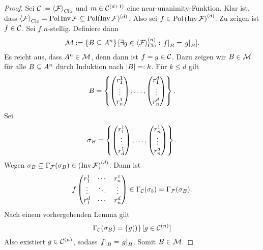 \documentclass{book}
\begin{document}
\begin{proof}
    Sei $\cC:=\gen{\cF}_{\Clo}$ und $m\in\mathcal{C}^{(d+1)}$ eine near-unanimity-Funktion. Klar ist, dass $\gen{\cF}_{\Clo}=\Pol\Inv\cF\setleq\Pol(\Inv\cF)^{(d)}$. Also sei $f\in\mathop\mathrm{Pol}{(\mathop\mathrm{Inv}\mathcal{F})}^{(d)}$. Zu zeigen ist $f\in \mathcal{C}$. Sei $f$ $n$-stellig. Definiere dann
    $$
    \cM :=\set{B\setleq A^n}[\exists g\in\gen{\cF}_{\Clo}^{(n)}:\rest{f}_{B}=\rest{g}_{B}].
    $$
    Es reicht aus, dass $A^n\in\mathcal{M}$, denn dann ist $f=g\in\mathcal{C}$. Dazu zeigen wir $B\in\mathcal{M}$ für alle $B\subseteq A^n$ durch Induktion nach $\left|B\right|=:k$.
    Für $k\leq d$ gilt
    $$
    B = \left\{
        \begin{pmatrix}
            r_1^1\\
            \vdots\\
            r_n^1
        \end{pmatrix},\ldots,
        \begin{pmatrix}
            r_1^d\\
            \vdots\\
            r_n^d
        \end{pmatrix}
\right\}.
$$
Sei
$$
\sigma_B = \left\{        \begin{pmatrix}
            r_1^1\\
            \vdots\\
            r_d^1
        \end{pmatrix},\ldots,
        \begin{pmatrix}
            r_n^1\\
            \vdots\\
            r_n^d
        \end{pmatrix}
\right\}.
$$
Wegen $\sigma_B\subseteq\Gamma_{\mathcal{F}}(\sigma_B)\in{(\mathop\mathrm{Inv}\mathcal{F})}^{(d)}$. Dann ist
$$
f
\begin{pmatrix}
    r_1^1 & \cdots & r_n^1\\
    \vdots & \ddots & \vdots\\
    r_1^d & \cdots & r_n^d
\end{pmatrix}
\in\Gamma_{\mathcal{C}}(\sigma_b)=\Gamma_{\mathcal{F}}(\sigma_B).
$$
Nach einem vorhergehenden Lemma gilt
$$
\Gamma_{\mathcal{C}}(\sigma_B)=\left\{g()\right\}[g\in \mathcal{C}^{(n)}]
$$
Also existiert $g\in\mathcal{C}^{(n)}$, sodass $\left. f\right\vert_B=\left. g\right\vert_B$. Somit $B\in\mathcal{M}$.


\end{proof}
\end{document}
